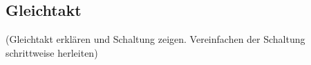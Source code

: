 \subsection{Gleichtakt} \label{subsec:gleichtakt}
(Gleichtakt erklären und Schaltung zeigen. Vereinfachen der Schaltung schrittweise herleiten)